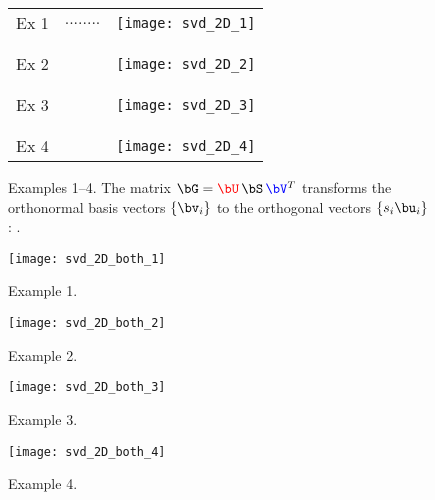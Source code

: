 \documentclass[11pt,titlepage,fleqn]{article}
\begin{document}


\setcounter{figure}{-1}

\clearpage\pagebreak
\pagestyle{empty}
\begin{figure}
\centering
\begin{tabular}{rcc}
Ex 1 & $........$ & \texttt{[image: svd\_2D\_1]} \\ \\ \\
Ex 2 & &\texttt{[image: svd\_2D\_2]} \\ \\ \\
Ex 3 & &\texttt{[image: svd\_2D\_3]} \\ \\ \\
Ex 4 & &\texttt{[image: svd\_2D\_4]} 
\end{tabular}
\caption[]
{{
Examples 1--4.
The matrix $\bG = \Ucolor\,\bS\,\Vcolor^T$ transforms the orthonormal basis vectors \textcolor{blue}{$\{\bv_i\}$} to the orthogonal vectors \textcolor{red}{$\{s_i\bu_i\}$}: \makebox{$\bG\Vcolor = \Ucolor\,\bS$}.
\label{fig:2D}
}}
\end{figure}

\clearpage\pagebreak
\begin{figure}
\hspace{-1cm}
\texttt{[image: svd\_2D\_both\_1]}
\caption[]
{{
Example 1.
\label{fig:ex1}
}}
\end{figure}

\clearpage\pagebreak
\begin{figure}
\hspace{-1cm}
\texttt{[image: svd\_2D\_both\_2]}
\caption[]
{{
Example 2.
\label{fig:ex2}
}}
\end{figure}

\clearpage\pagebreak
\begin{figure}
\hspace{-1cm}
\texttt{[image: svd\_2D\_both\_3]}
\caption[]
{{
Example 3.
\label{fig:ex3}
}}
\end{figure}

\clearpage\pagebreak
\begin{figure}
\hspace{-1cm}
\texttt{[image: svd\_2D\_both\_4]}
\caption[]
{{
Example 4.
\label{fig:ex4}
}}
\end{figure}
\end{document}
